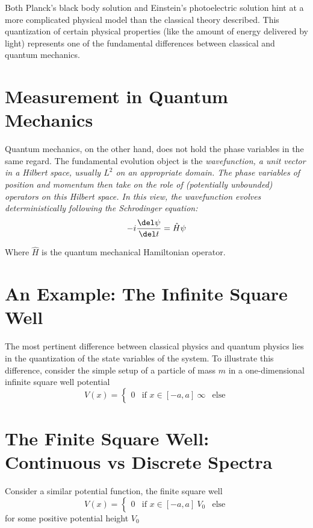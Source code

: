 Both Planck's black body solution and Einstein's photoelectric solution hint at
a more complicated physical model than the classical theory described.
This quantization of certain physical properties (like the amount of
energy delivered by light) represents one of the fundamental differences between
classical and quantum mechanics.

\section{Measurement in Quantum Mechanics}

Quantum mechanics, on the other hand, does not hold the phase variables in the
same regard. The fundamental evolution object is the \em{wavefunction}, a unit
vector in a Hilbert space, usually $L^2$ on an appropriate domain. The phase
variables of position and momentum then take on the role of (potentially
unbounded) operators on this Hilbert space. In this view, the wavefunction
evolves deterministically following the Schrodinger equation:
\[
    -i\frac{\del \psi}{\del t} = \hat{H}\psi
\]

Where $\hat{H}$ is the quantum mechanical Hamiltonian operator.


\section{An Example: The Infinite Square Well}

The most pertinent difference between classical physics and quantum physics lies
in the quantization of the state variables of the system. To illustrate this
difference, consider the simple setup of a particle of mass $m$ in a
one-dimensional infinite square well potential
\[
    V(x) = 
    \begin{cases}
        0 & \text{if } x\in[-a,a]\  \infty & \text{else}
    \end{cases}
\]


\section{The Finite Square Well: Continuous vs Discrete Spectra}

Consider a similar potential function, the finite square well
\[
    V(x) = 
    \begin{cases}
        0 & \text{if } x\in[-a,a]\  V_0 & \text{else}
    \end{cases}
\]
for some positive potential height $V_0$

